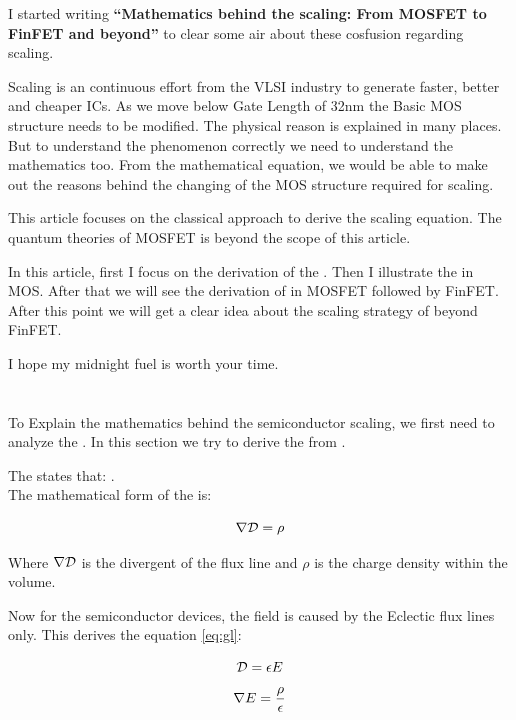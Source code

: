 \documentclass[a4paper]{article}
\begin{document}
I started writing \textbf{``Mathematics behind the scaling: From MOSFET to FinFET and beyond''} to clear some air about these cosfusion regarding scaling.

Scaling is an continuous effort from the VLSI industry to generate faster, better and cheaper ICs. As we move below Gate Length of 32nm the Basic MOS structure needs to be modified. The physical reason is explained in many places. But to understand the phenomenon correctly we need to understand the mathematics too. From the mathematical equation, we would be able to make out the reasons behind the changing of the MOS structure required for scaling.

This article focuses on the classical approach to derive the scaling equation. The quantum theories of MOSFET is beyond the scope of this article.

In this article, first I focus on the derivation of the \PE. Then I illustrate the \PE in MOS. After that we will see the derivation of \PE in MOSFET followed by FinFET. After this point we will get a clear idea about the scaling strategy of beyond FinFET.

I hope my midnight fuel is worth your time.
\pagebreak

\section{\PE}
\label{sec:poisson}
To Explain the mathematics behind the semiconductor scaling, we first need to analyze the \PE.
In this section we try to derive the \PE from \GL.

The \GL states that: \GLstate.\\
The mathematical form of the \GL is:

\begin{equation}
  \label{eq:gl}
  \nabla \mathcal{D} = \rho
\end{equation}

Where $\nabla \mathcal{D}$ is the divergent of the flux line and $\rho$ is the charge density within the volume.

Now for the semiconductor devices, the field is caused by the Eclectic flux lines only. This derives the equation \ref{eq:gl}:

\begin{equation}
  \mathcal{D} = \epsilon E\\
\end{equation}
\begin{equation}
  \label{eq:divE}
  \nabla E = \frac{\rho}{\epsilon}
\end{equation}
\end{document}
